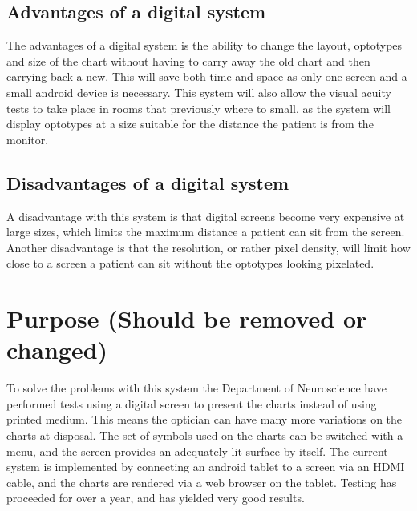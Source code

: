 \documentclass[12pt,a4paper,notitlepage]{report}
\begin{document}
\subsection{Advantages of a digital system}
The advantages of a digital system is the ability to change the layout, optotypes and size of the chart without having to carry away the old chart and then carrying back a new. This will save both time and space as only one screen and a small android device is necessary. This system will also allow the visual acuity tests to take place in rooms that previously where to small, as the system will display optotypes at a size suitable for the distance the patient is from the monitor.

\subsection{Disadvantages of a digital system}
A disadvantage with this system is that digital screens become very expensive at large sizes, which limits the maximum distance a patient can sit from the screen. Another disadvantage is that the resolution, or rather pixel density, will limit how close to a screen a patient can sit without the optotypes looking pixelated.






\section{Purpose (Should be removed or changed)}
To solve the problems with this system the Department of Neuroscience have performed tests using a digital screen to present the charts instead of using printed medium. This means the optician can have many more variations on the charts at disposal. The set of symbols used on the charts can be switched with a menu, and the screen provides an adequately lit surface by itself. The current system is implemented by connecting an android tablet to a screen via an HDMI cable, and the charts are rendered via a web browser on the tablet. Testing has proceeded for over a year, and has yielded very good results.
\end{document}
